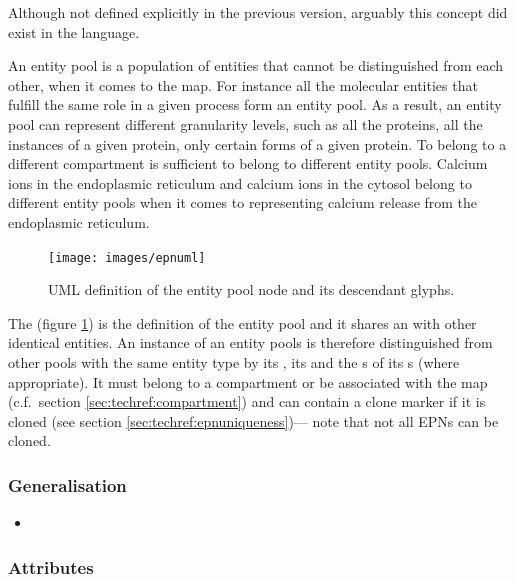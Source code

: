 Although not defined explicitly in the previous version, arguably this
concept did exist in the language.

\label{sec:techref:EPNs}\label{defn:EntityPoolNode}\label{sec:techref:EPN}

An entity pool is a population of entities that cannot be
distinguished from each other, when it comes to the \SBGNPDLone
map. For instance all the molecular entities that fulfill the same
role in a given process form an entity pool. As a result, an entity
pool can represent different granularity levels, such as all the
proteins, all the instances of a given protein, only certain forms of
a given protein. To belong to a different compartment is sufficient to
belong to different entity pools. Calcium ions in the endoplasmic
reticulum and calcium ions in the cytosol belong to different entity
pools when it comes to representing calcium release from the
endoplasmic reticulum.

\begin{figure}[htb]
  \centering
  \texttt{[image: images/epnuml]}
\caption{UML definition of the entity pool node and its descendant glyphs.}
  \label{fig:techref:epnuml}
\end{figure}

The  (figure \ref{fig:techref:epnuml}) is the
definition of the entity pool and it shares an 
with other identical entities. An instance of an entity pools is
therefore distinguished from other pools with the same entity type by
its , its  and the
s of its s (where
appropriate). It must belong to a compartment or be associated with
the map (c.f.\, section \ref{sec:techref:compartment}) and can contain a clone
marker if it is cloned (see section \ref{sec:techref:epnuniqueness})--- note
that not all EPNs can be cloned.

\subsubsection{Generalisation}

\begin{itemize}
\item {}
\end{itemize}

\subsubsection{Attributes}


